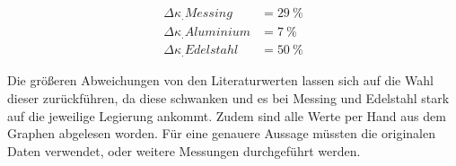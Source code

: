\begin{align*}
\Delta\kappa_.{Messing}		&=\SI{29}{\percent}\\
\Delta\kappa_.{Aluminium}	&=\SI{7}{\percent}\\
\Delta\kappa_.{Edelstahl}		&=\SI{50}{\percent}
\end{align*}

Die größeren Abweichungen von den Literaturwerten lassen sich auf die Wahl dieser zurückführen, da diese schwanken und es bei Messing und Edelstahl stark auf die jeweilige Legierung ankommt. Zudem sind alle Werte per Hand aus dem Graphen abgelesen worden. Für eine genauere Aussage müssten die originalen Daten verwendet, oder weitere Messungen durchgeführt werden.

